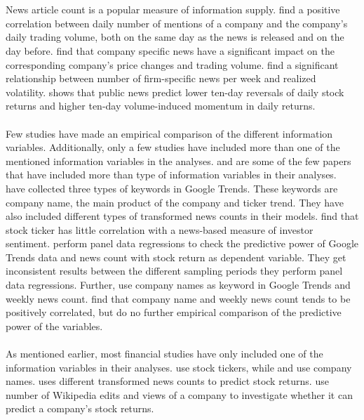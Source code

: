 \\\\
News article count is a popular measure of information supply. \cite{preis2013} find a positive correlation between daily number of mentions of a company and the company's daily trading volume, both on the same day as the news is released and on the day before. \cite{ryan} find that company specific news have a significant impact on the corresponding company's price changes and trading volume. \cite{vlastakis} find a significant relationship between number of firm-specific news per week and realized volatility. \cite{tetlock} shows that public news predict lower ten-day reversals of daily stock returns and higher ten-day volume-induced momentum in daily returns. 
\\\\
Few studies have made an empirical comparison of the different information variables. Additionally, only a few studies have included more than one of the mentioned information variables in the analyses. \cite{vlastakis} and \cite{engelberg} are some of the few papers that have included more than type of information variables in their analyses. \cite{engelberg} have collected three types of keywords in Google Trends. These keywords are company name, the main product of the company and ticker trend. They have also included different types of transformed news counts in their models. \cite{engelberg} find that stock ticker has little correlation with a news-based measure of investor sentiment. \cite{engelberg} perform panel data regressions to check the predictive power of Google Trends data and news count with stock return as dependent variable. They get inconsistent results between the different sampling periods they perform panel data regressions. Further, \cite{vlastakis} use company names as keyword in Google Trends and weekly news count. \cite{vlastakis} find that company name and weekly news count tends to be positively correlated, but do no further empirical comparison of the predictive power of the variables. 
\\\\
As mentioned earlier, most financial studies have only included one of the information variables in their analyses. \cite{joseph} use stock tickers, while \cite{neri} and \cite{bijl} use company names. \cite{tetlock} uses different transformed news counts to predict stock returns. \cite{moat} use number of Wikipedia edits and views of a company to investigate whether it can predict a company's stock returns.  
\\\\
